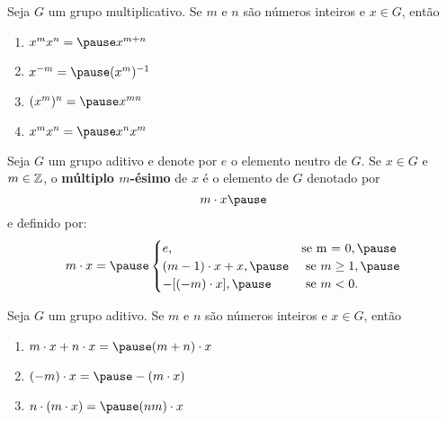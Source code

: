 \documentclass{beamer}
\begin{document}
    \begin{frame}
        \begin{proposicao}
            Seja $G$ um grupo multiplicativo. \pause Se $m$ e $n$ são números inteiros \pause e $x \in G$, \pause então \pause
            \begin{enumerate}[label={\roman*})]
                \item $x^mx^n = \pause x^{m + n}$ \pause

                \item $x^{-m} = \pause (x^m)^{-1}$ \pause

                \item $(x^m)^n = \pause x^{mn}$ \pause

                \item $x^mx^n = \pause x^nx^m$
            \end{enumerate}
        \end{proposicao}
    \end{frame}

    \begin{frame}
        Seja $G$ um grupo aditivo \pause e denote por $e$ o elemento neutro de $G$. \pause Se $x \in G$ \pause e $m \in \mathbb{Z}$, \pause o \textbf{múltiplo $m$-ésimo} de $x$ \pause é o elemento de $G$ denotado por \pause
        \[
            m \cdot x \pause
        \]
        e definido por:
        \[
            m \cdot x = \pause \begin{cases}
                    e, & \mbox{se m = 0}, \pause\\
                    (m - 1)\cdot x + x, \pause & \mbox{ se } m \ge 1, \pause\\
                    -[(-m) \cdot x], \pause & \mbox{ se } m < 0.
                   \end{cases}
        \]
    \end{frame}

    \begin{frame}
        \begin{proposicao}
            Seja $G$ um grupo aditivo. \pause Se $m$ e $n$ são números inteiros \pause e $x \in G$, então \pause
            \begin{enumerate}[label={\roman*})]
                \item $m \cdot x + n \cdot x = \pause (m + n) \cdot x$ \pause

                \item $(-m) \cdot x = \pause -(m \cdot x)$ \pause

                \item $n\cdot (m \cdot x) = \pause (nm)\cdot x$
            \end{enumerate}
        \end{proposicao}
    \end{frame}
\end{document}
